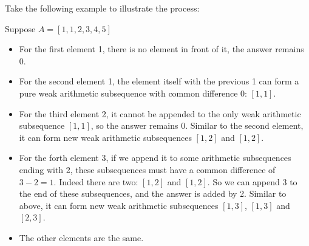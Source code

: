 Take the following example to illustrate the process:

Suppose $A =[1, 1, 2, 3, 4, 5]$

\begin{itemize}
\item For the first element 1, there is no element in front of it, the answer remains 0.

\item For the second element 1, the element itself with the previous 1 can form a pure weak arithmetic subsequence with common difference 0: $[1, 1]$.

\item For the third element 2, it cannot be appended to the only weak arithmetic subsequence $[1, 1]$, so the answer remains 0. Similar to the second element, it can form new weak arithmetic subsequences $[1, 2]$ and $[1, 2]$.

\item For the forth element 3, if we append it to some arithmetic subsequences ending with 2, these subsequences must have a common difference of $3 - 2 = 1$. Indeed there are two: $[1, 2]$ and $[1, 2]$. So we can append 3 to the end of these subsequences, and the answer is added by 2. Similar to above, it can form new weak arithmetic subsequences $[1, 3]$, $[1, 3]$ and $[2, 3]$.

\item The other elements are the same.
\end{itemize}

